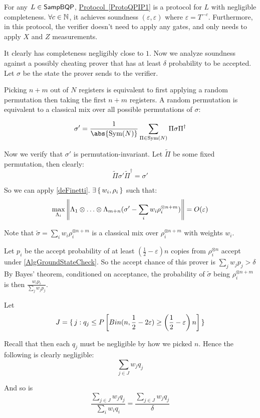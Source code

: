 \begin{thm}
    \label{QPIP1thm}
	For any $L\in\operatorname{\mathsf{SampBQP}}$, \hyperref[ProtoQPIP1]{Protocol~\ref*{ProtoQPIP1}} is a protocol for $L$ with negligible completeness. $\forall c\in\mathbb{N}$, it achieves soundness $(\varepsilon, \varepsilon)$ where $\varepsilon=T^{-c}$. Furthermore, in this protocol, the verifier doesn't need to apply any gates, and only needs to apply $X$ and $Z$ measurements.
\end{thm}
\begin{prf}
	It clearly has completeness negligibly close to $1$. Now we analyze soundness against a possibly cheating prover that has at least $\delta$ probability to be accepted. Let $\sigma$ be the state the prover sends to the verifier.

	Picking $n+m$ out of $N$ registers is equivalent to first applying a random permutation then taking the first $n+m$ registers.
	A random permutation is equivalent to a classical mix over all possible permutations of $\sigma$:

	$$\sigma'=\frac{1}{\abs{\Sym(N)}}\sum_{\Pi\in\Sym(N)}\Pi\sigma\Pi^\dagger$$

	Now we verify that $\sigma'$ is permutation-invariant.
	Let $\tilde{\Pi}$ be some fixed permutation, then clearly:
	$$\tilde{\Pi}\sigma'\tilde{\Pi}^\dagger=\sigma'$$

	So we can apply \cref{deFinetti}. $\exists\set{w_i, \rho_i}$ such that:
	$$\max_{\Lambda_i}\left\lVert\Lambda_1\otimes\ldots\otimes\Lambda_{m+n}(\sigma'-\sum_i w_i\rho_i^{\otimes n+m})\right\rVert=O(\varepsilon)$$

	Note that $\tilde\sigma=\sum_i w_i\rho_i^{\otimes n+m}$ is a classical mix over $\rho_i^{\otimes n+m}$ with weights $w_i$.

	Let $p_i$ be the accept probability of at least $(\frac{1}{2}-\varepsilon)n$ copies from $\rho_i^{\otimes n}$ accept under \cref{AlgGroundStateCheck}.
	So the accept chance of this prover is $\sum_j w_j p_j>\delta$
	By Bayes' theorem, conditioned on acceptance, the probability of $\tilde{\sigma}$ being $\rho_i^{\otimes n+m}$ is then $\frac{w_i p_i}{\sum_j w_j p_j}$.

	Let
	$$J=\set{j:q_j\leq P\left[Bin(n, \frac{1}{2}-2\varepsilon)\geq\left(\frac{1}{2}-\varepsilon\right)n\right]}$$

	Recall that then each $q_j$ must be negligible by how we picked $n$. Hence the following is clearly negligible:
	$$\sum_{j\in J} w_j q_j$$

	And so is
	$$\frac{\sum_{j\in J} w_j q_j}{\sum_i w_i q_i}=\frac{\sum_{j\in J} w_j q_j}{\delta}$$


\end{prf}
